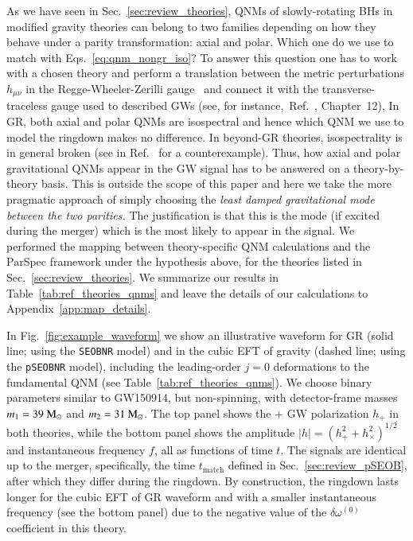 \documentclass[twocolumn,
               prd,
               aps,
               superscriptaddress,
               tightenlines,
               nofootinbib,
               eqsecnum,
               amsfonts,
               amsmath,
               longbibliography]{revtex4-1}
\newcommand{\pSEOB}{\texttt{pSEOBNR}}
\newcommand{\msun}{~{\rm M}_{\odot}}
\begin{document}
As we have seen in Sec.~\ref{sec:review_theories}, QNMs of slowly-rotating
BHs in modified gravity theories can belong to two families depending on how
they behave under a parity transformation: axial and polar. Which one do
we use to match with Eqs.~\eqref{eq:qnm_nongr_iso}?
%
To answer this question one has to work with a chosen theory and perform a
translation between the metric perturbations $h_{\mu\nu}$ in the
Regge-Wheeler-Zerilli gauge~\cite{Regge:1957td,Zerilli:1970se} and connect it with the transverse-traceless gauge
used to described GWs (see, for instance,~Ref.~\cite{Maggiore:2018sht}, Chapter~12),
%
In GR, both axial and polar QNMs are isospectral and hence which QNM we use to
model the ringdown makes no difference.
%
In beyond-GR theories, isospectrality is in general broken (see
in Ref.~\cite{Hui:2021cpm} for a counterexample).
%
Thus, how axial and polar gravitational QNMs appear in the GW signal has to be
answered on a theory-by-theory basis.
%
This is outside the scope of this paper and here we take the more pragmatic
approach of simply choosing the \emph{least damped gravitational mode between
the two parities.}
%
The justification is that this is the mode (if excited during the merger) which is
the most likely to appear in the signal.
We performed the mapping between theory-specific QNM calculations and the ParSpec framework
under the hypothesis above, for the theories listed in Sec.~\ref{sec:review_theories}.
%
We summarize our results in Table~\ref{tab:ref_theories_qnms} and
leave the details of our calculations to Appendix~\ref{app:map_details}.

In Fig.~\ref{fig:example_waveform} we show an illustrative waveform for GR (solid line; using the \texttt{SEOBNR} model) and in the cubic EFT of gravity (dashed line; using the \pSEOB{} model),
including the leading-order $j = 0$ deformations to the fundamental QNM (see Table~\ref{tab:ref_theories_qnms}).
%
We choose binary parameters similar to GW150914,  but non-spinning, with detector-frame masses
$m_1 = 39\msun$ and $m_2 = 31\msun$.
%
The top panel shows the $+$ GW polarization $h_{+}$ in both theories,
while the bottom panel shows the amplitude $|h| = (h_{+}^2 + h_{\times}^2)^{1/2}$
and instantaneous frequency $f$, all as functions of time $t$.
%
The signals are identical up to the merger, specifically, the time $t_\textrm{match}$
defined in Sec.~\ref{sec:review_pSEOB}, after which they differ during the ringdown.
%
By construction, the ringdown lasts longer for the cubic EFT of GR waveform and
with a smaller instantaneous frequency (see the bottom panel) due to the negative value of the
$\delta\omega^{(0)}$ coefficient in this theory.
\end{document}
